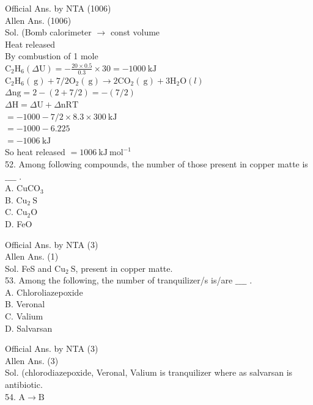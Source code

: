 \documentclass[10pt]{article}
\begin{document}
Official Ans. by NTA (1006)\\
Allen Ans. (1006)\\
Sol. (Bomb calorimeter \(\rightarrow\) const volume\\
Heat released\\
By combustion of 1 mole\\
\(\mathrm{C}_{2} \mathrm{H}_{6}(\Delta \mathrm{U})=-\frac{20 \times 0.5}{0.3} \times 30=-1000 \mathrm{~kJ}\)\\
\(\mathrm{C}_{2} \mathrm{H}_{6}(\mathrm{~g})+7 / 2 \mathrm{O}_{2}(\mathrm{~g}) \rightarrow 2 \mathrm{CO}_{2}(\mathrm{~g})+3 \mathrm{H}_{2} \mathrm{O}(l)\)\\
\(\Delta \mathrm{ng}=2-(2+7 / 2)=-(7 / 2)\)\\
\(\Delta \mathrm{H}=\Delta \mathrm{U}+\Delta \mathrm{nRT}\)\\
\(=-1000-7 / 2 \times 8.3 \times 300 \mathrm{~kJ}\)\\
\(=-1000-6.225\)\\
\(=-1006 \mathrm{~kJ}\)\\
So heat released \(=1006 \mathrm{~kJ} \mathrm{~mol}^{-1}\)\\
52. Among following compounds, the number of those present in copper matte is \(\_\_\_\_\) .\\
A. \(\mathrm{CuCO}_{3}\)\\
B. \(\mathrm{Cu}_{2} \mathrm{~S}\)\\
C. \(\mathrm{Cu}_{2} \mathrm{O}\)\\
D. FeO

Official Ans. by NTA (3)\\
Allen Ans. (1)\\
Sol. FeS and \(\mathrm{Cu}_{2} \mathrm{~S}\), present in copper matte.\\
53. Among the following, the number of tranquilizer/s is/are \(\_\_\_\_\) .\\
A. Chloroliazepoxide\\
B. Veronal\\
C. Valium\\
D. Salvarsan

Official Ans. by NTA (3)\\
Allen Ans. (3)\\
Sol. (chlorodiazepoxide, Veronal, Valium is tranquilizer where as salvarsan is antibiotic.\\
54. \(\mathrm{A} \rightarrow \mathrm{B}\)
\end{document}
